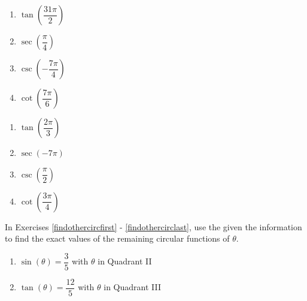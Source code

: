 \begin{multicols}{4}

\begin{enumerate}

\setcounter{enumi}{\value{HW}}

\item $\tan \left( \dfrac{31\pi}{2} \right)$
\item $\sec \left( \dfrac{\pi}{4} \right)$ 
\item $\csc \left( -\dfrac{7\pi}{4} \right)$
\item $\cot \left( \dfrac{7\pi}{6} \right)$

\setcounter{HW}{\value{enumi}}

\end{enumerate}

\end{multicols}

\begin{multicols}{4}

\begin{enumerate}

\setcounter{enumi}{\value{HW}}

\item $\tan \left( \dfrac{2\pi}{3} \right)$
\item $\sec \left( -7\pi \right)$ 
\item $\csc \left( \dfrac{\pi}{2} \right)$ 
\item $\cot \left( \dfrac{3\pi}{4} \right)$ \label{circvaluelast}

\setcounter{HW}{\value{enumi}}

\end{enumerate}

\end{multicols}

In Exercises \ref{findothercircfirst} - \ref{findothercirclast}, use the given the information to find the exact values of the remaining circular functions of $\theta$.

\begin{multicols}{2}

\begin{enumerate}

\setcounter{enumi}{\value{HW}}

\item $\sin(\theta) = \dfrac{3}{5}$ with $\theta$ in Quadrant II \label{findothercircfirst}
\item $\tan(\theta) = \dfrac{12}{5}$ with $\theta$ in Quadrant III

\setcounter{HW}{\value{enumi}}

\end{enumerate}

\end{multicols}

